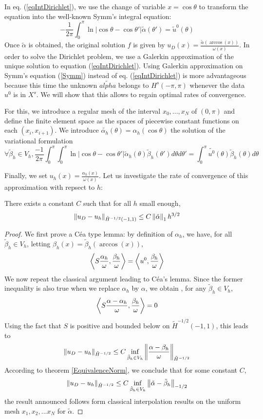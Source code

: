 \documentclass[10pt,a4paper]{article}
\begin{document}
In eq. (\ref{eqIntDirichlet}), we use the change of variable $x = \cos\theta$ to transform the equation into the well-known Symm's integral equation:
\begin{equation}
	-\frac{1}{2\pi} \int_{0}^{\pi} \ln|\cos\theta - \cos \theta'|\tilde{\alpha}(\theta') = \tilde{u}^0(\theta)
	\label{Symm}
\end{equation}
Once $\tilde{\alpha}$ is obtained, the original solution $f$ is given by $u_D(x) = \frac{\tilde{\alpha}(\arccos(x))}{\omega(x)}$. 
In order to solve the Dirichlet problem, we use a Galerkin approximation of the unique solution to equation (\ref{eqIntDirichlet}). Using Galerkin approximation on Symm's equation (\ref{Symm}) instead of eq. (\ref{eqIntDirichlet}) is more advantageous because this time the unknown $\tilde{alpha}$ belongs to $H^{s}(-\pi,\pi)$ whenever the data $u^0$ is in $X^s$. We will show that this allows to regain optimal rates of convergence. 

For this, we introduce a regular mesh of the interval $x_0, ..., x_N$ of $(0,\pi)$ and define the finite element space as the spaces of piecewise constant functions on each $(x_i, x_{i+1})$. We introduce $\tilde{\alpha_h}(\theta) = \alpha_h(\cos\theta)$ the solution of the variational formulation 
\begin{equation}
	\forall \tilde{\beta}_h \in V_h, \frac{-1}{2\pi}\int_{0}^{\pi}\int_{0}^{\pi} \ln|\cos\theta - \cos\theta'|\tilde{\alpha}_h(\theta)\tilde{\beta}_h(\theta')d\theta d\theta' = \int_{0}^{\pi} \tilde{u^0}(\theta)\tilde{\beta}_h(\theta)d\theta
\end{equation}

Finally, we set $u_h(x) = \frac{\alpha_h(x)}{\omega(x)}$. 
Let us investigate the rate of convergence of this approximation with repsect to $h$:
\begin{Prop}
	There exists a constant $C$ such that for all $h$ small enough, 
	\[ \left\|u_D - u_h\right\|_{\tilde{H}^{-1/2}(-1,1)} \leq C \left\|\tilde{\alpha}\right\|_{1}h^{3/2}\]
	\begin{proof}
		We first prove a Céa type lemma: by definition of $\alpha_h$, we have, for all $\tilde{\beta}_h \in V_h$, letting $\beta_h(x) = \tilde{\beta}_h(\arccos(x))$, 
		\[\left\langle S\frac{\alpha_h}{\omega},\frac{\beta_h}{\omega}\right\rangle = \left\langle u^0,\frac{\beta_h}{\omega}\right\rangle\]	
		We now repeat the classical argument leading to Céa's lemma. Since the former inequality is also true when we replace $\alpha_h$ by $\alpha$, we obtain , for any $\tilde{\beta}_h \in V_h$, 
		\[\left\langle S \frac{\alpha- \alpha_h}{\omega},\frac{\beta_h}{\omega}\right\rangle = 0 \]			
		Using the fact that $S$ is positive and bounded below on $\tilde{H}^{-1/2}(-1,1)$, this leads to 
		\[ \left\|u_D - u_h\right\|_{\tilde{H}^{-1/2}} \leq C \inf_{\tilde{\beta}_h \in V_h} \left\|\frac{\alpha - \beta_h}{\omega}\right\|_{\tilde{H}^{-1/2}}\]
		According to theorem \ref{EquivalenceNorm}, we conclude that for some constant $C$, 
		\[ \left\|u_D - u_h\right\|_{\tilde{H}^{-1/2}} \leq C \inf_{\tilde{\beta}_h \in V_h} \left\|\tilde{\alpha} - \tilde{\beta}_h\right\|_{-1/2}\]
		the result announced follows form classical interpolation results on the uniform mesh $x_1, x_2,...x_N$ for $\tilde{\alpha}$. 
	\end{proof}
\end{Prop}
\end{document}
